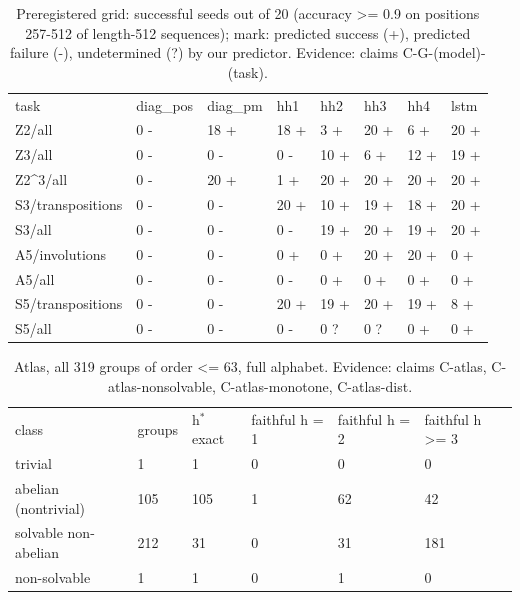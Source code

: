 \documentclass[10pt,twocolumn,a4paper]{article}
\begin{document}
\begin{table}[t]\centering\small\caption{Preregistered grid: successful seeds out of 20 (accuracy >= 0.9 on positions 257-512 of length-512 sequences); mark: predicted success (+), predicted failure (-), undetermined (?) by our predictor. Evidence: claims C-G-(model)-(task).}
\begin{tabular}{llllllll}\hline
task & diag\_pos & diag\_pm & hh1 & hh2 & hh3 & hh4 & lstm \\
Z2/all & 0 - & 18 + & 18 + & 3 + & 20 + & 6 + & 20 + \\
Z3/all & 0 - & 0 - & 0 - & 10 + & 6 + & 12 + & 19 + \\
Z2\^{}3/all & 0 - & 20 + & 1 + & 20 + & 20 + & 20 + & 20 + \\
S3/transpositions & 0 - & 0 - & 20 + & 10 + & 19 + & 18 + & 20 + \\
S3/all & 0 - & 0 - & 0 - & 19 + & 20 + & 19 + & 20 + \\
A5/involutions & 0 - & 0 - & 0 + & 0 + & 20 + & 20 + & 0 + \\
A5/all & 0 - & 0 - & 0 - & 0 + & 0 + & 0 + & 0 + \\
S5/transpositions & 0 - & 0 - & 20 + & 19 + & 20 + & 19 + & 8 + \\
S5/all & 0 - & 0 - & 0 - & 0 ? & 0 ? & 0 + & 0 + \\\hline
\end{tabular}\end{table}
\begin{table}[t]\centering\small\caption{Atlas, all 319 groups of order <= 63, full alphabet. Evidence: claims C-atlas, C-atlas-nonsolvable, C-atlas-monotone, C-atlas-dist.}
\begin{tabular}{llllll}\hline
class & groups & h$^*$ exact & faithful h = 1 & faithful h = 2 & faithful h >= 3 \\
trivial & 1 & 1 & 0 & 0 & 0 \\
abelian (nontrivial) & 105 & 105 & 1 & 62 & 42 \\
solvable non-abelian & 212 & 31 & 0 & 31 & 181 \\
non-solvable & 1 & 1 & 0 & 1 & 0 \\\hline
\end{tabular}\end{table}
\end{document}
